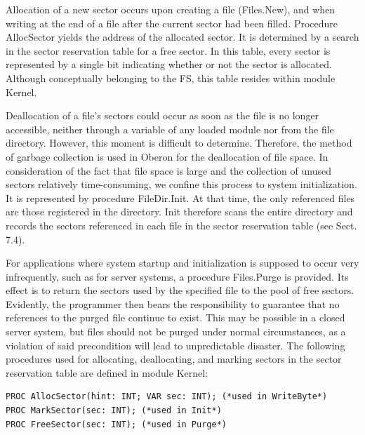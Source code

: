 Allocation of a new sector occurs upon creating a file (Files.New), and when writing at the end of
a file after the current sector had been filled. Procedure AllocSector yields the address of the
allocated sector. It is determined by a search in the sector reservation table for a free sector. In
this table, every sector is represented by a single bit indicating whether or not the sector is
allocated. Although conceptually belonging to the FS, this table resides within module
Kernel.

Deallocation of a file's sectors could occur as soon as the file is no longer accessible, neither
through a variable of any loaded module nor from the file directory. However, this moment is
difficult to determine. Therefore, the method of garbage collection is used in Oberon for the
deallocation of file space. In consideration of the fact that file space is large and the collection of
unused sectors relatively time-consuming, we confine this process to system initialization. It is
represented by procedure FileDir.Init. At that time, the only referenced files are those registered
in the directory. Init therefore scans the entire directory and records the sectors referenced in
each file in the sector reservation table (see Sect. 7.4).

For applications where system startup and initialization is supposed to occur very infrequently,
such as for server systems, a procedure Files.Purge is provided. Its effect is to return the sectors
used by the specified file to the pool of free sectors. Evidently, the programmer then bears the
responsibility to guarantee that no references to the purged file continue to exist. This may be
possible in a closed server system, but files should not be purged under normal circumstances,
as a violation of said precondition will lead to unpredictable disaster.
The following procedures used for allocating, deallocating, and marking sectors in the sector
reservation table are defined in module Kernel:
\begin{verbatim}
PROC AllocSector(hint: INT; VAR sec: INT); (*used in WriteByte*)
PROC MarkSector(sec: INT); (*used in Init*)
PROC FreeSector(sec: INT); (*used in Purge*)
\end{verbatim}
